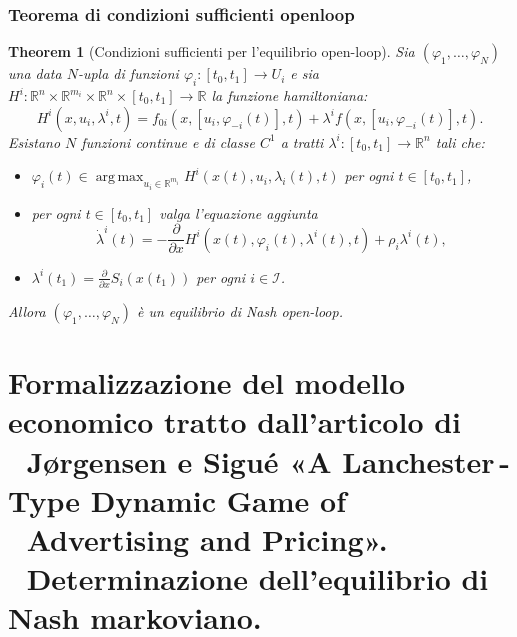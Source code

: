 \documentclass{beamer}
\theoremstyle{plain}
\newtheorem{thm}{Theorem}[section]
\theoremstyle{definition}
\DeclareMathOperator*{\argmax}{arg\,max}
\begin{document}
\begin{frame}
\footnotesize
\frametitle{Teorema di condizioni sufficienti openloop}
\begin{thm}[Condizioni sufficienti per l'equilibrio open-loop]
Sia $(\varphi_1,\dots,\varphi_N)$ una data $N$-upla di funzioni $\varphi_i: [t_0, t_1] \to U_i$ e sia $H^i:\mathbb{R}^n \times \mathbb{R}^{m_i} \times \mathbb{R}^n \times [t_0, t_1] \to \mathbb{R}$ la funzione hamiltoniana:
    \[
    H^i(x, u_i, \lambda^i, t) = f_{0i}(x, [u_i, \varphi_{-i}(t)], t) + \lambda^i f(x, [u_i, \varphi_{-i}(t)], t).
    \]
Esistano $N$ funzioni continue e di classe $C^1$ a tratti $\lambda^i: [t_0, t_1] \to \mathbb{R}^n$ tali che:
\begin{itemize}
        \item 
        $\varphi_i(t) \in \argmax_{u_i \in \mathbb{R}^{m_i}} H^i(x(t), u_i, \lambda_i(t), t)$ per ogni $t \in [t_0,t_1]$,
        \item per ogni $t \in [t_0, t_1]$ valga l'\emph{equazione aggiunta}
        \[
        \dot{\lambda}^i(t) = - \frac{\partial}{\partial x} H^i(x(t), \varphi_i(t), \lambda^i(t), t) + \rho_i\lambda^i(t),
        \]
        \item $\lambda^i(t_1) = \frac{\partial}{\partial x} S_i(x(t_1))$ per ogni $i \in \mathcal{I}$.
\end{itemize}
Allora $(\varphi_1,\dots,\varphi_N)$ è un equilibrio di Nash open-loop. 
\end{thm}
\end{frame}

\section{Formalizzazione del modello economico tratto dall'articolo di\\ \,\,\,\,J{\o}rgensen e Sigué «A Lanchester\,-Type Dynamic Game of \\ \,\,\,\,Advertising and Pricing». \\
\,\,\,\,Determinazione dell'equilibrio di Nash markoviano. }
\end{document}
